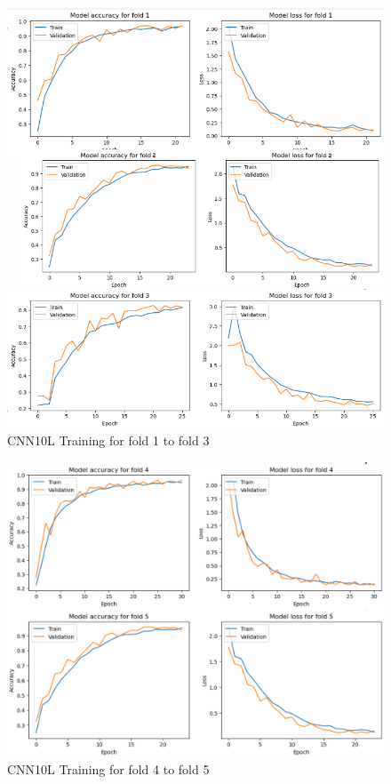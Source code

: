 \begin{figure}
    \centering
    \includegraphics[width=1\linewidth]{graphics//chapter5/cnn10L training fold1-3.png}
    \caption{CNN10L Training for fold 1 to fold 3}
    \label{fig:cnn10l-fold1-3}
\end{figure}

\begin{figure}
    \centering
    \includegraphics[width=1\linewidth]{graphics//chapter5/cnn10L training fold4-5.png}
    \caption{CNN10L Training for fold 4 to fold 5}
    \label{fig:cnn10l-fold4-5}
\end{figure}

\FloatBarrier

